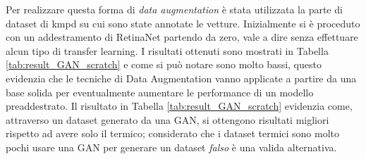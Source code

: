 Per realizzare questa forma di \textit{data augmentation} è stata utilizzata la parte di dataset di \ac{kmpd} su cui sono state annotate le vetture. Inizialmente si è proceduto con un addestramento di RetinaNet partendo da zero, vale a dire senza effettuare alcun tipo di transfer learning. 
I risultati ottenuti sono mostrati in Tabella \ref{tab:result_GAN_scratch} e come si può notare sono molto bassi, questo evidenzia che le tecniche di Data Augmentation vanno applicate a partire da una base solida per eventualmente aumentare le performance di un modello preaddestrato. Il risultato in Tabella \ref{tab:result_GAN_scratch} evidenzia come, attraverso un dataset generato da una \ac{GAN}, si ottengono risultati migliori rispetto ad avere solo il termico; considerato che i dataset termici sono molto pochi usare una \ac{GAN} per generare un dataset \textit{falso} è una valida alternativa.
\begin{table}[]
    \caption{Risultati del test di RetinaNet sul dataset di \ac{kmpd} dopo una fase di addestramento su dati generati da \ac{GAN}. Nella colonna \textit{NOGAN} sono presenti i risultati ottenuti addestrando solamente sulla parte di \ac{kmpd} visibile e testando sul termico reale.}
    \label{tab:result_GAN_scratch}
\end{table}

